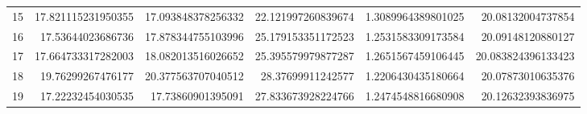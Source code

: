 \begin{tabular}{lrrrrr}
15 & 17.821115231950355 & 17.093848378256332 & 22.121997260839674 & 1.3089964389801025 & 20.08132004737854 \\
16 & 17.53644023686736 & 17.878344755103996 & 25.179153351172523 & 1.2531583309173584 & 20.09148120880127 \\
17 & 17.664733317282003 & 18.082013516026652 & 25.395579979877287 & 1.2651567459106445 & 20.083824396133423 \\
18 & 19.76299267476177 & 20.377563707040512 & 28.37699911242577 & 1.2206430435180664 & 20.07873010635376 \\
19 & 17.22232454030535 & 17.73860901395091 & 27.833673928224766 & 1.2474548816680908 & 20.12632393836975 \\
\hline
\end{tabular}

